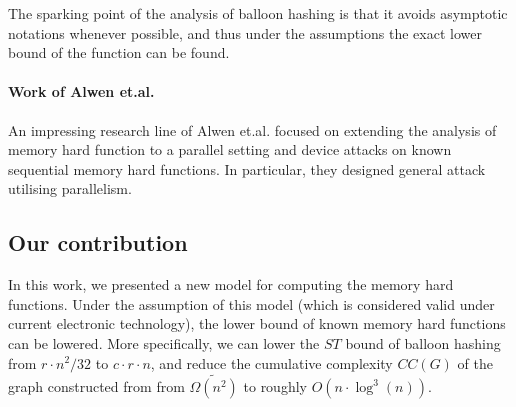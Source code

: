 The sparking point of the analysis of balloon hashing is that it avoids asymptotic notations whenever possible, and thus under the assumptions the
exact lower bound of the function can be found.

\paragraph{Work of Alwen et.al.}
An impressing research line of Alwen et.al. focused on extending the analysis of memory hard function to a parallel setting and device attacks on known sequential
memory hard functions. In particular, they designed general attack utilising parallelism.

\subsection{Our contribution}
In this work, we presented a new model for computing the memory hard functions. Under the assumption of this model (which is considered valid under
current electronic technology), the lower bound of known memory hard functions can be lowered. More specifically, we can lower the $ST$ bound of balloon
hashing from $r \cdot n^2/32$ to $c \cdot r \cdot n$, and reduce the cumulative complexity $CC(G)$ of the graph constructed from \cite{alwen2015high}
from $\tilde{\Omega(n^2)}$ to roughly $O(n \cdot \log^3(n))$.
